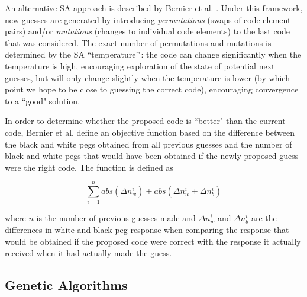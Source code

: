 \documentclass[11pt]{article}
\begin{document}
An alternative SA approach is described by Bernier et al. \cite{bernier1996solving}. Under this framework, new guesses are generated by introducing \textit{permutations} (swaps of code element pairs) and/or \textit{mutations} (changes to individual code elements) to the last code that was considered. The exact number of permutations and mutations is determined by the SA ``temperature'": the code can change significantly when the temperature is high, encouraging exploration of the state of potential next guesses, but will only change slightly when the temperature is lower (by which point we hope to be close to guessing the correct code), encouraging convergence to a ``good" solution.

In order to determine whether the proposed code is ``better" than the current code, Bernier et al. define an objective function based on the difference between the black and white pegs obtained from all previous guesses and the number of black and white pegs that would have been obtained if the newly proposed guess were the right code. The function is defined as

\[
\sum_{i=1}^n abs(\Delta n_w^i) + abs(\Delta n_w^i + \Delta n_b^i)
\]

\noindent where $n$ is the number of previous guesses made and $\Delta n_w^i $ and $\Delta n_b^i$ are the differences in white and black peg response when comparing the response that would be obtained if the proposed code were correct with the response it actually received when it had actually made the guess. 
%

\subsection{Genetic Algorithms}
\end{document}
